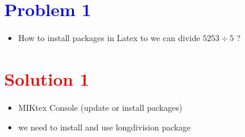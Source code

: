 \documentclass[17pt,british]{article}
\begin{document}
\section*{\textcolor{blue}{Problem 1}}

\begin{itemize}
\item How to install packages in Latex  to we can divide $5253\div5$ ?
\end{itemize}

\section*{\textcolor{red}{Solution 1}}
\begin{itemize}

\item MIKtex Console (update or install packages)

\item we need to install and use longdivision package

\end{itemize}

\\
\end{document}
